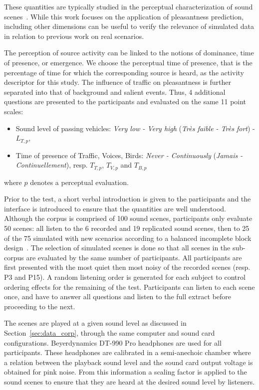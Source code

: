 \documentclass[11pt,a4paper]{article}
\begin{document}
These quantities are typically studied in the perceptual characterization of sound scenes~\cite{axelsson2010, aumond2017, nilsson2007}. While this work focuses on the application of pleasantness prediction, including other dimensions can be useful to verify the relevance of simulated data in relation to previous work on real scenarios.

The perception of source activity can be linked to the notions of dominance, time of presence, or emergence. We choose the perceptual time of presence, that is the percentage of time for which the corresponding source is heard, as the activity descriptor for this study. The influence of traffic on pleasantness is further separated into that of background and salient events. Thus, 4 additional questions are presented to the participants and evaluated on the same 11 point scales:
\begin{itemize}
\item Sound level of passing vehicles: \textit{Very low - Very high} (\textit{Tr\`es faible - Tr\`es fort}) - $L_{T, p}$,
\item Time of presence of Traffic, Voices, Birds: \textit{Never - Continuously} (\textit{Jamais - Continuellement}), resp. $T_{T, p}$, $T_{V, p}$ and $T_{B, p}$
\end{itemize}
where $p$ denotes a perceptual evaluation.

Prior to the test, a short verbal introduction is given to the participants and the interface is introduced to ensure that the quantities are well understood. Although the corpus is comprised of 100 sound scenes, participants only evaluate 50 scenes: all listen to the 6 recorded and 19 replicated sound scenes, then to 25 of the 75 simulated with new scenarios according to a balanced incomplete block design~\cite{dagnelie2003}. The selection of simulated scenes is done so that all scenes in the sub-corpus are evaluated by the same number of participants. All participants are first presented with the most quiet then most noisy of the recorded scenes (resp. P3 and P15). A random listening order is generated for each subject to control ordering effects for the remaining of the test. Participants can listen to each scene once, and have to answer all questions and listen to the full extract before proceeding to the next.

The scenes are played at a given sound level as discussed in Section~\ref{sec:data_corp}, through the same computer and sound card configurations. Beyerdynamics DT-990 Pro headphones are used for all participants. These headphones are calibrated in a semi-anechoic chamber where a relation between the playback sound level and the sound card output voltage is obtained for pink noise. From this information a scaling factor is applied to the sound scenes to ensure that they are heard at the desired sound level by listeners.
\end{document}
